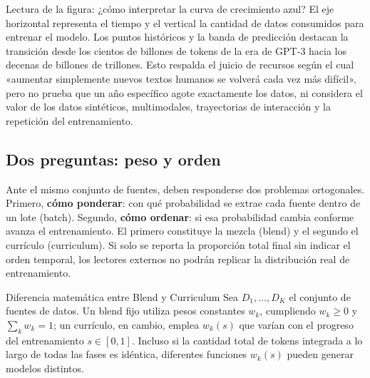 
\begin{knowledgebox}{Lectura de la figura: ¿cómo interpretar la curva de crecimiento azul?}
El eje horizontal representa el tiempo y el vertical la cantidad de datos consumidos para entrenar el modelo. Los puntos históricos y la banda de predicción destacan la transición desde los cientos de billones de tokens de la era de GPT-3 hacia los decenas de billones de trillones. Esto respalda el juicio de recursos según el cual «aumentar simplemente nuevos textos humanos se volverá cada vez más difícil», pero no prueba que un año específico agote exactamente los datos, ni considera el valor de los datos sintéticos, multimodales, trayectorias de interacción y la repetición del entrenamiento.
\end{knowledgebox}

\subsection{Dos preguntas: peso y orden}

Ante el mismo conjunto de fuentes, deben responderse dos problemas ortogonales. Primero, \textbf{cómo ponderar}: con qué probabilidad se extrae cada fuente dentro de un lote (batch). Segundo, \textbf{cómo ordenar}: si esa probabilidad cambia conforme avanza el entrenamiento. El primero constituye la mezcla (blend) y el segundo el currículo (curriculum). Si solo se reporta la proporción total final sin indicar el orden temporal, los lectores externos no podrán replicar la distribución real de entrenamiento.


\begin{importantbox}{Diferencia matemática entre Blend y Curriculum}
Sea $D_1,\ldots,D_K$ el conjunto de fuentes de datos. Un blend fijo utiliza pesos constantes $w_k$, cumpliendo $w_k\ge 0$ y $\sum_k w_k=1$; un currículo, en cambio, emplea $w_k(s)$ que varían con el progreso del entrenamiento $s\in[0,1]$. Incluso si la cantidad total de tokens integrada a lo largo de todas las fases es idéntica, diferentes funciones $w_k(s)$ pueden generar modelos distintos.
\end{importantbox}

